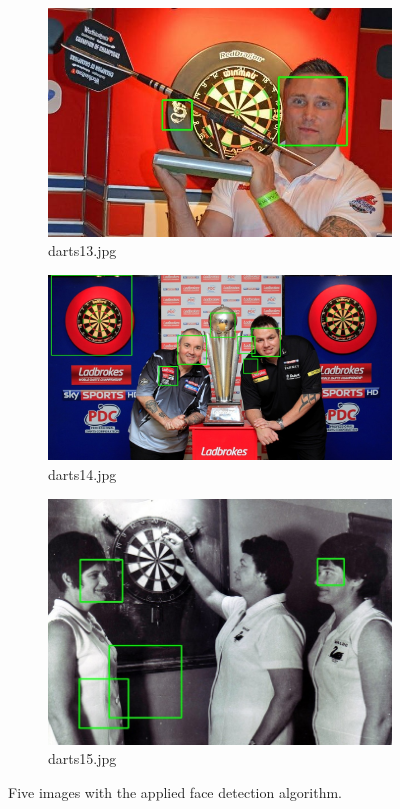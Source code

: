 \documentclass[conference]{IEEEtran}
\begin{document}
\begin{figure}[htb]
\begin{subfigure}{.5\linewidth}
  \centering
  \includegraphics[width=.9\linewidth]{images/detected2.jpg}
  \caption{darts13.jpg}
  \label{fig:sub1}
\end{subfigure}%
\begin{subfigure}{.5\linewidth}
  \centering
  \includegraphics[width=.9\linewidth]{images/detected3.jpg}
  \caption{darts14.jpg}
  \label{fig:sub2}
\end{subfigure}


\begin{subfigure}{.5\linewidth}
\centering
\includegraphics[width=0.9\linewidth]{images/detected4.jpg}
\caption{darts15.jpg}
\end{subfigure}


\caption{Five images with the applied face detection algorithm.}
\label{fig:q13}
\end{figure}
\end{document}

